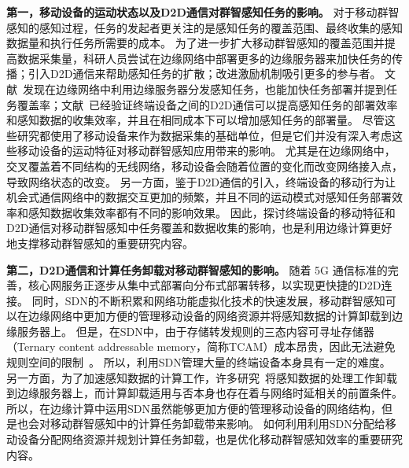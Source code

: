 
\textbf{第一，移动设备的运动状态以及D2D通信对群智感知任务的影响。}
对于移动群智感知的感知过程，任务的发起者更关注的是感知任务的覆盖范围、最终收集的感知数据量和执行任务所需要的成本。
为了进一步扩大移动群智感知的覆盖范围并提高数据采集量，科研人员尝试在边缘网络中部署更多的边缘服务器来加快任务的传播；引入D2D通信来帮助感知任务的扩散；改进激励机制吸引更多的参与者。
文献~\cite{DBLP:journals/tpds/ZhaoMTL15,DBLP:conf/infocom/RimalVM16}发现在边缘网络中利用边缘服务器分发感知任务，也能加快任务部署并提到任务覆盖率；文献~\cite{DBLP:conf/mwcn/OrsiniBL15,gao2015cloudlets}已经验证终端设备之间的D2D通信可以提高感知任务的部署效率和感知数据的收集效率，并且在相同成本下可以增加感知任务的部署量。
尽管这些研究都使用了移动设备来作为数据采集的基础单位，但是它们并没有深入考虑这些移动设备的运动特征对移动群智感知应用带来的影响。
尤其是在边缘网络中，交叉覆盖着不同结构的无线网络，移动设备会随着位置的变化而改变网络接入点，导致网络状态的改变。
另一方面，鉴于D2D通信的引入，终端设备的移动行为让机会式通信网络中的数据交互更加的频繁，并且不同的运动模式对感知任务部署效率和感知数据收集效率都有不同的影响效果。
因此，探讨终端设备的移动特征和D2D通信对移动群智感知中任务覆盖和数据收集的影响，也是利用边缘计算更好地支撑移动群智感知的重要研究内容。



\textbf{第二，D2D通信和计算任务卸载对移动群智感知的影响。}
随着 5G 通信标准的完善，核心网服务正逐步从集中式部署向分布式部署转移，以实现更快捷的D2D连接。
同时，SDN的不断积累和网络功能虚拟化技术的快速发展，移动群智感知可以在边缘网络中更加方便的管理移动设备的网络资源并将感知数据的计算卸载到边缘服务器上。
但是，在SDN中，由于存储转发规则的三态内容可寻址存储器（Ternary content addressable memory，简称TCAM）成本昂贵，因此无法避免规则空间的限制~\cite{Katta:2014es}。
所以，利用SDN管理大量的终端设备本身具有一定的难度。
另一方面，为了加速感知数据的计算工作，许多研究~\cite{DBLP:conf/mobilecloud/TakahashiTK15,DBLP:conf/edge/LiuWB16}将感知数据的处理工作卸载到边缘服务器上，而计算卸载适用与否本身也存在着与网络时延相关的前置条件。
所以，在边缘计算中运用SDN虽然能够更加方便的管理移动设备的网络结构，但是也会对移动群智感知中的计算任务卸载带来影响。
如何利用利用SDN分配给移动设备分配网络资源并规划计算任务卸载，也是优化移动群智感知效率的重要研究内容。


